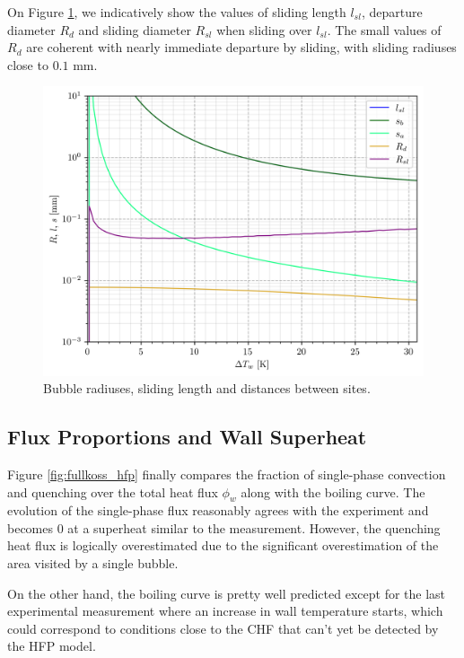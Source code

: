 \npar

On Figure \ref{fig:fullkoss_length}, we indicatively show the values of sliding length $l_{sl}$, departure diameter $R_{d}$ and sliding diameter $R_{sl}$ when sliding over $l_{sl}$. The small values of $R_{d}$ are coherent with nearly immediate departure by sliding, with sliding radiuses close to $0.1$ mm.


\begin{figure}[!h]
\centering
\includegraphics[width=0.5\linewidth]{img/HFP/fullcomp_Koss/length_G2000.png}
\caption{Bubble radiuses, sliding length and distances between sites.}
\label{fig:fullkoss_length}
\end{figure}



\subsection{Flux Proportions and Wall Superheat}

Figure \ref{fig:fullkoss_hfp} finally compares the fraction of single-phase convection and quenching over the total heat flux $\phi_{w}$ along with the boiling curve. The evolution of the single-phase flux reasonably agrees with the experiment and becomes 0 at a superheat similar to the measurement. However, the quenching heat flux is logically overestimated due to the significant overestimation of the area visited by a single bubble.

\npar

On the other hand, the boiling curve is pretty well predicted except for the last experimental measurement where an increase in wall temperature starts, which could correspond to conditions close to the CHF that can't yet be detected by the HFP model.

